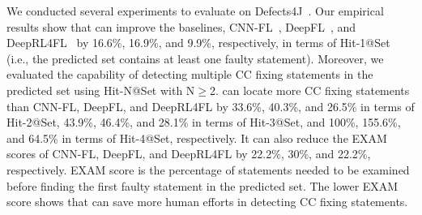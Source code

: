 

We conducted several experiments to evaluate {\tool} on
Defects4J~\cite{defects4j}. Our empirical results show that \tool can
improve the baselines, CNN-FL~\cite{zhang2019cnn},
DeepFL~\cite{DeepFL}, and DeepRL4FL~\cite{icse21-fl} by 16.6\%,
16.9\%, and 9.9\%, respectively, in terms of Hit-1@Set (i.e., the
predicted set contains at least one faulty statement). Moreover, we
evaluated the capability of detecting multiple CC fixing statements in
the predicted set using Hit-N@Set with N$\ge$2. {\tool} can locate
more CC fixing statements than CNN-FL, DeepFL, and DeepRL4FL by
33.6\%, 40.3\%, and 26.5\% in terms of Hit-2@Set, 43.9\%, 46.4\%, and
28.1\% in terms of Hit-3@Set, and 100\%, 155.6\%, and 64.5\% in terms
of Hit-4@Set, respectively. It can also reduce the EXAM scores
of CNN-FL, DeepFL, and DeepRL4FL by 22.2\%, 30\%, and 22.2\%,
respectively. EXAM score is the percentage of statements needed to be
examined before finding the first faulty statement in the predicted
set.
The lower EXAM score shows that {\tool} can save more human efforts in
detecting CC fixing statements.


